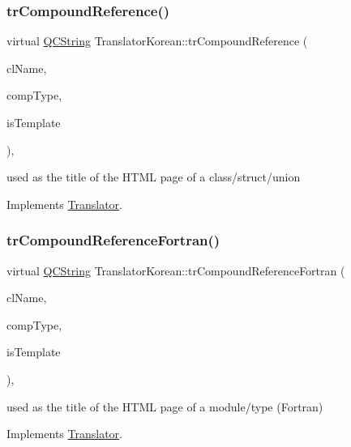 \subsubsection{\texorpdfstring{trCompoundReference()}{trCompoundReference()}}
{\footnotesize\ttfamily virtual \mbox{\hyperlink{class_q_c_string}{Q\+C\+String}} Translator\+Korean\+::tr\+Compound\+Reference (\begin{DoxyParamCaption}\item[{const char $\ast$}]{cl\+Name,  }\item[{\mbox{\hyperlink{class_class_def_ae70cf86d35fe954a94c566fbcfc87939}{Class\+Def\+::\+Compound\+Type}}}]{comp\+Type,  }\item[{bool}]{is\+Template }\end{DoxyParamCaption})\hspace{0.3cm}{\ttfamily [inline]}, {\ttfamily [virtual]}}

used as the title of the H\+T\+ML page of a class/struct/union 

Implements \mbox{\hyperlink{class_translator}{Translator}}.

\mbox{\label{class_translator_korean_a74bed2b0376f1726b31adc4241559f14}} 
\subsubsection{\texorpdfstring{trCompoundReferenceFortran()}{trCompoundReferenceFortran()}}
{\footnotesize\ttfamily virtual \mbox{\hyperlink{class_q_c_string}{Q\+C\+String}} Translator\+Korean\+::tr\+Compound\+Reference\+Fortran (\begin{DoxyParamCaption}\item[{const char $\ast$}]{cl\+Name,  }\item[{\mbox{\hyperlink{class_class_def_ae70cf86d35fe954a94c566fbcfc87939}{Class\+Def\+::\+Compound\+Type}}}]{comp\+Type,  }\item[{bool}]{is\+Template }\end{DoxyParamCaption})\hspace{0.3cm}{\ttfamily [inline]}, {\ttfamily [virtual]}}

used as the title of the H\+T\+ML page of a module/type (Fortran) 

Implements \mbox{\hyperlink{class_translator}{Translator}}.

